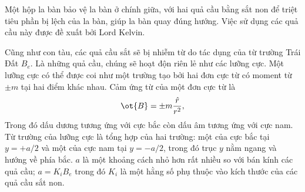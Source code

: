 \begin{vd}
\begin{enumerate}[1)]
        Một hộp la bàn bảo vệ la bàn ở chính giữa, với hai quả cầu bằng sắt non để triệt tiêu phần bị lệch của la bàn, giúp la bàn quay đúng hướng. Việc sử dụng các quả cầu này được đề xuất bởi Lord Kelvin.

    Cũng như con tàu, các quả cầu sắt sẽ bị nhiễm từ do tác dụng của từ trường Trái Đất $B_e$. Là những quả cầu, chúng sẽ hoạt độn riên lẻ như các lưỡng cực. Một lưỡng cực có thể được coi như một trường tạo bởi hai đơn cực từ có moment từ $\pm m$ tại hai điểm khác nhau.
    Cảm ứng từ của một đơn cực từ là
    $$\ot{B}=\pm m\dfrac{\hat r}{r^2},$$
    Trong đó dấu dương tương ứng với cực bắc còn dấu âm tương ứng với cực nam. Từ trường của lưỡng cực là tổng hợp của hai trường: một của cực bắc tại $y=+a/2$ và một của cực nam tại $y=-a/2$, trong đó trục $y$ nằm ngang và hướng về phía bắc. $a$ là một khoảng cách nhỏ hơn rất nhiều so với bán kính các quả cầu; $a=K_iB_e$ trong đó $K_i$ là một hằng số phụ thuộc vào kích thước của các quả cầu sắt non.
    \begin{center}
        


\begin{tikzpicture}[x=0.75pt,y=0.75pt,yscale=-1,xscale=1]


\end{tikzpicture}
\end{center}
\end{enumerate}
\end{vd}
